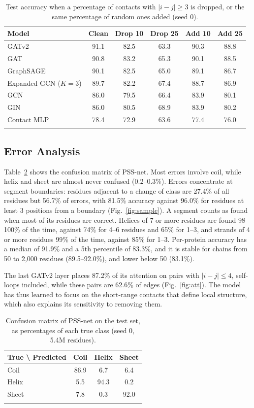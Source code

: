 \documentclass[pdflatex,sn-mathphys-num]{sn-jnl}
\begin{document}
\begin{table}[t]
\caption{Test accuracy when a percentage of contacts with $|i-j| \geq 3$ is dropped, or the same percentage of random ones added (seed 0).}
\label{tab:robust}
\begin{tabular}{lccccc}
\toprule
Model & Clean & Drop 10 & Drop 25 & Add 10 & Add 25 \\
\midrule
GATv2 & 91.1 & 82.5 & 63.3 & 90.3 & 88.8 \\
GAT & 90.8 & 83.2 & 65.3 & 90.1 & 88.5 \\
GraphSAGE & 90.1 & 82.5 & 65.0 & 89.1 & 86.7 \\
Expanded GCN ($K=3$) & 89.7 & 82.2 & 67.4 & 88.7 & 86.9 \\
GCN & 86.0 & 79.5 & 66.4 & 83.9 & 80.1 \\
GIN & 86.0 & 80.5 & 68.9 & 83.9 & 80.2 \\
Contact MLP & 78.4 & 72.9 & 63.6 & 77.4 & 76.0 \\
\botrule
\end{tabular}
\end{table}

\subsection{Error Analysis}

Table~\ref{tab:conf} shows the confusion matrix of PSS-net. Most errors involve coil, while helix and sheet are almost never confused (0.2--0.3\%). Errors concentrate at segment boundaries: residues adjacent to a change of class are 27.4\% of all residues but 56.7\% of errors, with 81.5\% accuracy against 96.0\% for residues at least 3 positions from a boundary (Fig.~\ref{fig:sample}). A segment counts as found when most of its residues are correct. Helices of 7 or more residues are found 98--100\% of the time, against 74\% for 4--6 residues and 65\% for 1--3, and strands of 4 or more residues 99\% of the time, against 85\% for 1--3. Per-protein accuracy has a median of 91.9\% and a 5th percentile of 83.3\%, and it is stable for chains from 50 to 2,000 residues (89.5--92.0\%), and lower below 50 (83.1\%).

The last GATv2 layer places 87.2\% of its attention on pairs with $|i-j| \leq 4$, self-loops included, while these pairs are 62.6\% of edges (Fig.~\ref{fig:att}). The model has thus learned to focus on the short-range contacts that define local structure, which also explains its sensitivity to removing them.

\begin{table}[t]
\caption{Confusion matrix of PSS-net on the test set, as percentages of each true class (seed 0, 5.4M residues).}
\label{tab:conf}
\begin{tabular}{lccc}
\toprule
True \textbackslash{} Predicted & Coil & Helix & Sheet \\
\midrule
Coil & 86.9 & 6.7 & 6.4 \\
Helix & 5.5 & 94.3 & 0.2 \\
Sheet & 7.8 & 0.3 & 92.0 \\
\botrule
\end{tabular}
\end{table}
\end{document}
